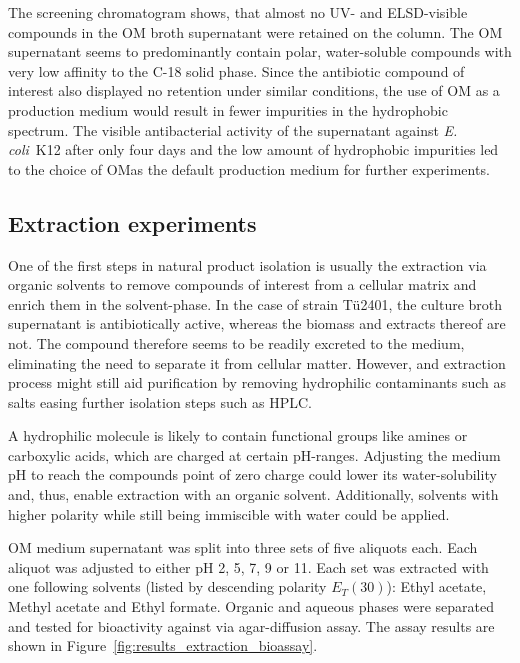The screening chromatogram shows, that almost no UV- and ELSD-visible compounds in the OM broth supernatant were retained on the column.
The OM supernatant seems to predominantly contain polar, water-soluble compounds with very low affinity to the C-18 solid phase.
Since the antibiotic compound of interest also displayed no retention under similar conditions, the use of OM as a production medium would result in fewer impurities in the hydrophobic spectrum.
The visible antibacterial activity of the supernatant against \textit{E. coli}~K12 after only four days and the low amount of hydrophobic impurities led to the choice of OMas the default production medium for further experiments.

\subsection{Extraction experiments}
\label{sub:extraction_experiments}

One of the first steps in natural product isolation is usually the extraction via organic solvents to remove compounds of interest from a cellular matrix and enrich them in the solvent-phase.\autocite{Dragull2012,Sticher2008}
In the case of strain Tü2401, the culture broth supernatant is antibiotically active, whereas the biomass and extracts thereof are not.
The compound therefore seems to be readily excreted to the medium, eliminating the need to separate it from cellular matter.
However, and extraction process might still aid purification by removing hydrophilic contaminants such as salts easing further isolation steps such as HPLC.

A hydrophilic molecule is likely to contain functional groups like amines or carboxylic acids, which are charged at certain pH-ranges.
Adjusting the medium pH to reach the compounds point of zero charge could lower its water-solubility and, thus, enable extraction with an organic solvent.
Additionally, solvents with higher polarity while still being immiscible with water could be applied.

OM medium supernatant was split into three sets of five aliquots each.
Each aliquot was adjusted to either pH 2, 5, 7, 9 or 11.
Each set was extracted with one following solvents (listed by descending polarity $E_T (30)$):\autocite{Marcus1993}
Ethyl acetate, Methyl acetate and Ethyl formate.
Organic and aqueous phases were separated and tested for bioactivity against \coli{} via agar-diffusion assay.
The assay results are shown in Figure~\ref{fig:results_extraction_bioassay}.

